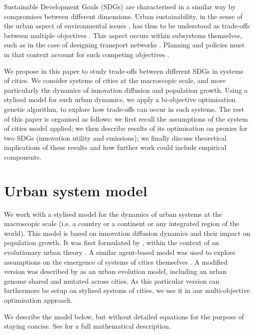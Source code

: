 \documentclass{article}
\begin{document}
Sustainable Development Goals (SDGs) are characterised in a similar way by compromises between different dimensions. Urban sustainability, in the sense of the urban aspect of environmental issues \cite{finco2001pathways}, has thus to be understood as trade-offs between multiple objectives \cite{viguie2012trade}. This aspect occurs within subsystems themselves, such as in the case of designing transport networks \cite{sharma2011multiobjective}. Planning and policies must in that context account for such competing objectives \cite{caparros2015optimised}.

We propose in this paper to study trade-offs between different SDGs in systems of cities. We consider systems of cities at the macroscopic scale, and more particularly the dynamics of innovation diffusion and population growth. Using a stylised model for such urban dynamics, we apply a bi-objective optimisation genetic algorithm, to explore how trade-offs can occur in such systems. The rest of this paper is organised as follows: we first recall the assumptions of the system of cities model applied; we then describe results of its optimisation on proxies for two SDGs (innovation utility and emissions); we finally discuss theoretical implications of these results and how further work could include empirical components.



\section{Urban system model}

We work with a stylised model for the dynamics of urban systems at the macroscopic scale (i.e. a country or a continent or any integrated region of the world). This model is based on innovation diffusion dynamics and their impact on population growth. It was first formulated by \cite{favaro2011gibrat}, within the context of an evolutionary urban theory \cite{pumain1997pour}. A similar agent-based model was used to explore assumptions on the emergence of systems of cities themselves \cite{schmitt2015half}. A modified version was described by \cite{raimbault2020model} as an urban evolution model, including an urban genome shared and mutated across cities. As this particular version can furthermore be setup on stylised systems of cities, we use it in our multi-objective optimisation approach.

We describe the model below, but without detailed equations for the purpose of staying concise. See \cite{raimbault2020model} for a full mathematical description.
\end{document}
